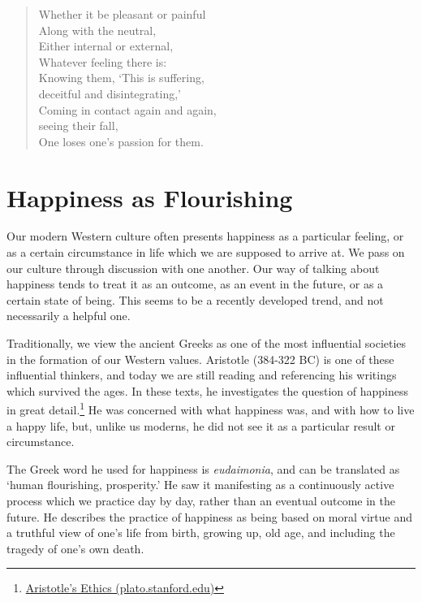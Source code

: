 \begin{quote}
Whether it be pleasant or painful\\
Along with the neutral,\\
Either internal or external,\\
Whatever feeling there is:\\
Knowing them, `This is suffering,\\
deceitful and disintegrating,'\\
Coming in contact again and again,\\
seeing their fall,\\
One loses one's passion for them.

\bigskip

\end{quote}

\clearpage

\section{Happiness as Flourishing}


\noindent Our modern Western culture often presents happiness as a
particular feeling, or as a certain circumstance in life which we are
supposed to arrive at. We pass on our culture through discussion with
one another. Our way of talking about happiness tends to treat it as an
outcome, as an event in the future, or as a certain state of being. This
seems to be a recently developed trend, and not necessarily a helpful
one.

Traditionally, we view the ancient Greeks as one of the most influential
societies in the formation of our Western values. Aristotle (384-322 BC)
is one of these influential thinkers, and today we are still reading and
referencing his writings which survived the ages. In these texts, he
investigates the question of happiness in great detail.\footnote{\href{https://plato.stanford.edu/entries/aristotle-ethics/}{Aristotle's
  Ethics (plato.stanford.edu)}} He was concerned with what happiness
was, and with how to live a happy life, but, unlike us moderns, he did
not see it as a particular result or circumstance.

The Greek word he used for happiness is \emph{eudaimonia}, and can be
translated as `human flourishing, prosperity.' He saw it manifesting as
a continuously active process which we practice day by day, rather than
an eventual outcome in the future. He describes the practice of
happiness as being based on moral virtue and a truthful view of one's
life from birth, growing up, old age, and including the tragedy of one's
own death.

